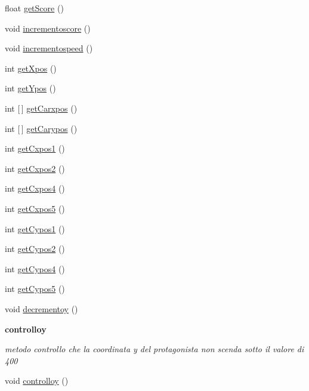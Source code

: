 \begin{Indent}
\begin{DoxyCompactItemize}
\item 
float \hyperlink{classcargame_1_1condivisa_ae2d024d6283b37c1e717238ba1c36909}{get\+Score} ()
\item 
void \hyperlink{classcargame_1_1condivisa_abe3e2d27707b3c79441cae6d9d59296f}{incrementoscore} ()
\item 
void \hyperlink{classcargame_1_1condivisa_afdb352ea73981b978cd227f30f58779c}{incrementospeed} ()
\item 
int \hyperlink{classcargame_1_1condivisa_a3e38fd4d482650ff5fbb4ed8482de884}{get\+Xpos} ()
\item 
int \hyperlink{classcargame_1_1condivisa_a07f761ace0143e14220c2905ceb2cb37}{get\+Ypos} ()
\item 
int \mbox{[}$\,$\mbox{]} \hyperlink{classcargame_1_1condivisa_a1a0fa95c76119cc26dfcbba5c30066fa}{get\+Carxpos} ()
\item 
int \mbox{[}$\,$\mbox{]} \hyperlink{classcargame_1_1condivisa_a0a5a97aaafcb53566afc1767134f4bca}{get\+Carypos} ()
\item 
int \hyperlink{classcargame_1_1condivisa_a27fca0bd2f18175eab0edbca75a34788}{get\+Cxpos1} ()
\item 
int \hyperlink{classcargame_1_1condivisa_a6344ddec07fd3cb38fd06dea41f8889b}{get\+Cxpos2} ()
\item 
int \hyperlink{classcargame_1_1condivisa_a4043cc22dca0beb331b9092cd575990b}{get\+Cxpos4} ()
\item 
int \hyperlink{classcargame_1_1condivisa_a771f05879a86ed8fc0da2333d872989e}{get\+Cxpos5} ()
\item 
int \hyperlink{classcargame_1_1condivisa_ada67793f376b8b32838932eb4fde8873}{get\+Cypos1} ()
\item 
int \hyperlink{classcargame_1_1condivisa_ab355a204dacee68d747ca55a2a36905e}{get\+Cypos2} ()
\item 
int \hyperlink{classcargame_1_1condivisa_a9dd958f70987f67ad2360cefe9266053}{get\+Cypos4} ()
\item 
int \hyperlink{classcargame_1_1condivisa_a882afa3a9ce3c5e27c4ab9621ae9c8d8}{get\+Cypos5} ()
\item 
void \hyperlink{classcargame_1_1condivisa_ad92dcd19309e0721961bc42f9ed605ed}{decrementoy} ()
\end{DoxyCompactItemize}
\end{Indent}
\begin{Indent}\textbf{ controlloy}\par
{\em metodo controllo che la coordinata y del protagonista non scenda sotto il valore di 400 }\begin{DoxyCompactItemize}
\item 
void \hyperlink{classcargame_1_1condivisa_ae9e74ddcbb1dc6bf32f46cb712222303}{controlloy} ()
\end{DoxyCompactItemize}
\end{Indent}
